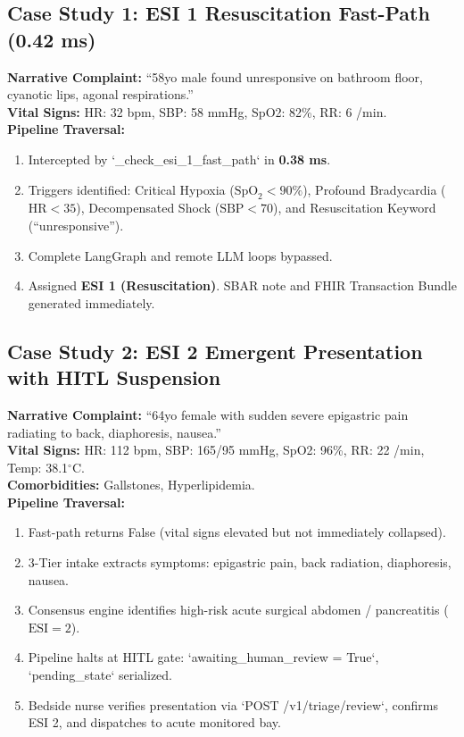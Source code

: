 \documentclass[11pt,a4paper]{article}
\begin{document}
\subsection{Case Study 1: ESI 1 Resuscitation Fast-Path (0.42 ms)}
\textbf{Narrative Complaint:} ``58yo male found unresponsive on bathroom floor, cyanotic lips, agonal respirations.''\\
\textbf{Vital Signs:} HR: 32 bpm, SBP: 58 mmHg, SpO2: 82\%, RR: 6 /min.\\
\textbf{Pipeline Traversal:}
\begin{enumerate}[leftmargin=1.5em]
    \item Intercepted by `_check_esi_1_fast_path` in \textbf{0.38 ms}.
    \item Triggers identified: Critical Hypoxia ($\text{SpO}_2 < 90\%$), Profound Bradycardia ($\text{HR} < 35$), Decompensated Shock ($\text{SBP} < 70$), and Resuscitation Keyword (``unresponsive'').
    \item Complete LangGraph and remote LLM loops bypassed.
    \item Assigned \textbf{ESI 1 (Resuscitation)}. SBAR note and FHIR Transaction Bundle generated immediately.
\end{enumerate}

\subsection{Case Study 2: ESI 2 Emergent Presentation with HITL Suspension}
\textbf{Narrative Complaint:} ``64yo female with sudden severe epigastric pain radiating to back, diaphoresis, nausea.''\\
\textbf{Vital Signs:} HR: 112 bpm, SBP: 165/95 mmHg, SpO2: 96\%, RR: 22 /min, Temp: 38.1$^\circ$C.\\
\textbf{Comorbidities:} Gallstones, Hyperlipidemia.\\
\textbf{Pipeline Traversal:}
\begin{enumerate}[leftmargin=1.5em]
    \item Fast-path returns False (vital signs elevated but not immediately collapsed).
    \item 3-Tier intake extracts symptoms: epigastric pain, back radiation, diaphoresis, nausea.
    \item Consensus engine identifies high-risk acute surgical abdomen / pancreatitis ($\text{ESI} = 2$).
    \item Pipeline halts at HITL gate: `awaiting_human_review = True`, `pending_state` serialized.
    \item Bedside nurse verifies presentation via `POST /v1/triage/review`, confirms ESI 2, and dispatches to acute monitored bay.
\end{enumerate}
\end{document}

